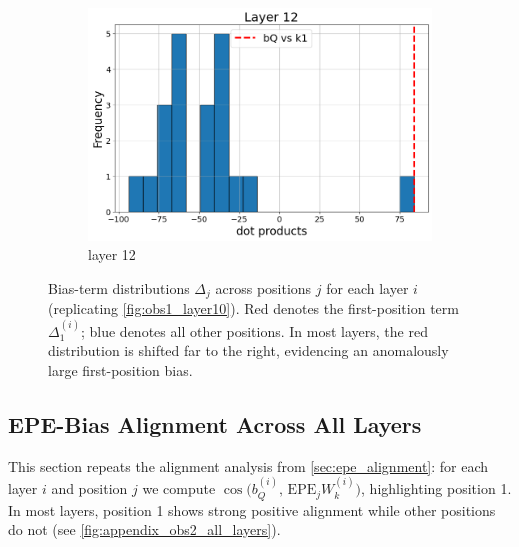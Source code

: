 \documentclass[11pt]{article}
\begin{document}
\begin{figure}[t]
\begin{subfigure}[t]{0.24\textwidth}
    \includegraphics[width=1.4\columnwidth]{figures/obs1_appendix/obs1_layer12.png}
    \caption{layer 12}
  \end{subfigure}\hfill
  \vspace{2mm}
  \caption{Bias-term distributions $\Delta_j$ across positions $j$ for each layer $i$ (replicating \cref{fig:obs1_layer10}). Red denotes the first-position term $\Delta_1^{(i)}$; blue denotes all other positions. In most layers, the red distribution is shifted far to the right, evidencing an anomalously large first-position bias.}
  \label{fig:appendix_obs1_all_layers}
\end{figure}

\subsection{EPE-Bias Alignment Across All Layers}\label{app:epe_bias}

This section repeats the alignment analysis from \cref{sec:epe_alignment}: for each layer $i$ and position $j$ we compute $\cos\big(b_Q^{(i)},\, \mathrm{EPE}_jW_k^{(i)}\big)$, highlighting position 1. In most layers, position 1 shows strong positive alignment while other positions do not (see \cref{fig:appendix_obs2_all_layers}).
\end{document}
